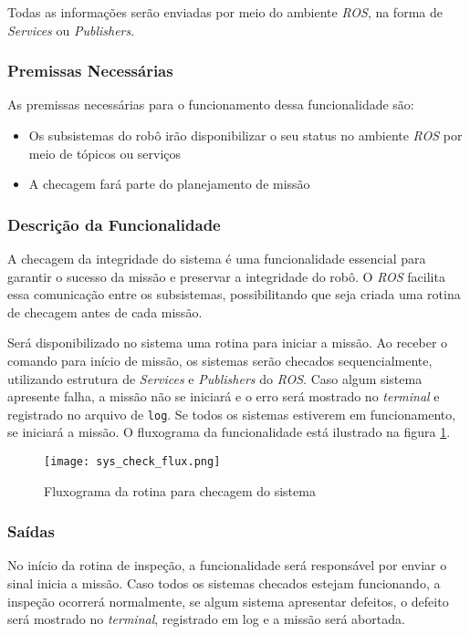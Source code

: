 Todas as informações serão enviadas por meio do ambiente \textit{ROS}, na forma de \textit{Services} ou \textit{Publishers}.

\subsubsection{Premissas Necessárias}
As premissas necessárias para o funcionamento dessa funcionalidade são:
\begin{itemize}
	\item Os subsistemas do robô irão disponibilizar o seu status no ambiente \textit{ROS} por meio de tópicos ou serviços
	\item A checagem fará parte do planejamento de missão
\end{itemize}

\subsubsection{Descrição da Funcionalidade}
A checagem da integridade do sistema é uma funcionalidade essencial para garantir o sucesso da missão e preservar a integridade do robô. O \textit{ROS} facilita essa comunicação entre os subsistemas, possibilitando que seja criada uma rotina de checagem antes de cada missão.

Será disponibilizado no sistema uma rotina para iniciar a missão. Ao receber o comando para início de missão, os sistemas serão checados sequencialmente, utilizando estrutura de \textit{Services} e \textit{Publishers} do \textit{ROS}. Caso algum sistema apresente falha, a missão não se iniciará e o erro será mostrado no \textit{terminal} e registrado no arquivo de \verb|log|. Se todos os sistemas estiverem em funcionamento, se iniciará a missão. O fluxograma da funcionalidade está ilustrado na figura \ref{fig:sys_check_flux}.	
\begin{figure}[h]
	\centering
	\texttt{[image: sys\_check\_flux.png]}
	\caption{Fluxograma da rotina para checagem do sistema}
	\label{fig:sys_check_flux}
\end{figure} 


\subsubsection{Saídas}
No início da rotina de inspeção, a funcionalidade será responsável por enviar o sinal inicia a missão. Caso todos os sistemas checados estejam funcionando, a inspeção ocorrerá normalmente, se algum sistema apresentar defeitos, o defeito será mostrado no \textit{terminal}, registrado em log e a missão será abortada.


